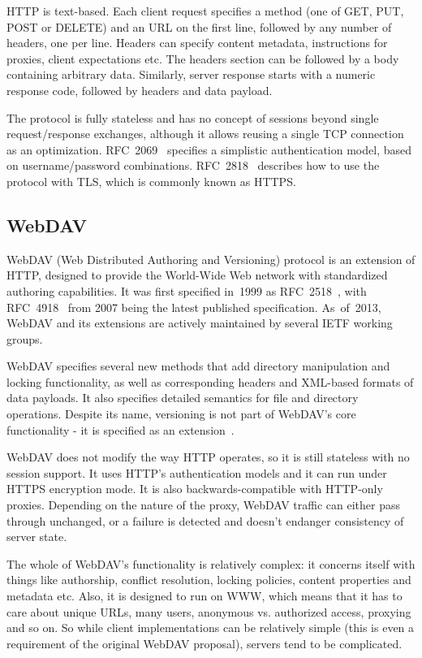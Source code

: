 HTTP is text-based. Each client request specifies a method (one of GET, PUT, POST or DELETE) and an URL on the
first line, followed by any number of headers, one per line.  Headers can specify content metadata,
instructions for proxies, client expectations etc. The headers section can be followed by a body containing
arbitrary data. Similarly, server response starts with a numeric response code, followed by headers and data
payload.

The protocol is fully stateless and has no concept of sessions beyond single request/response exchanges,
although it allows reusing a single TCP connection as an optimization.  RFC~2069~\cite{rfc2069} specifies a
simplistic authentication model, based on username/password combinations. RFC~2818~\cite{rfc2818} describes
how to use the protocol with TLS, which is commonly known as HTTPS.

\subsection{WebDAV}

WebDAV (Web Distributed Authoring and Versioning) protocol is an extension of HTTP, designed to provide the
World-Wide Web network with standardized authoring capabilities. It was first specified in~1999 as
RFC~2518~\cite{rfc2518}, with RFC~4918~\cite{rfc4918} from 2007 being the latest published specification.
As~of~2013, WebDAV and its extensions are actively maintained by several IETF working groups.

WebDAV specifies several new methods that add directory manipulation and locking functionality, as well as
corresponding headers and XML-based formats of data payloads. It also specifies detailed semantics for file
and directory operations. Despite its name, versioning is not part of WebDAV's core functionality - it is
specified as an extension~\cite{rfc3253}.

WebDAV does not modify the way HTTP operates, so it is still stateless with no session support. It uses HTTP's
authentication models and it can run under HTTPS encryption mode. It is also backwards-compatible with
HTTP-only proxies. Depending on the nature of the proxy, WebDAV traffic can either pass through unchanged, or
a failure is detected and doesn't endanger consistency of server state.

The whole of WebDAV's functionality is relatively complex: it concerns itself with things like authorship,
conflict resolution, locking policies, content properties and metadata etc. Also, it is designed to run on
WWW, which means that it has to care about unique URLs, many users, anonymous vs. authorized access, proxying
and so on. So while client implementations can be relatively simple (this is even a requirement of the original
WebDAV proposal), servers tend to be complicated.

